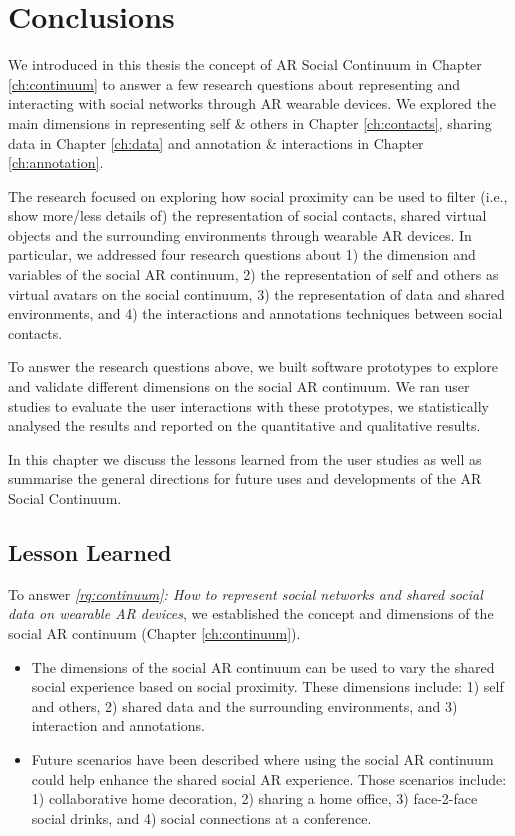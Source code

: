 \chapter{Conclusions}
\label{ch:conclusions}

We introduced in this thesis the concept of AR Social Continuum in Chapter \ref{ch:continuum} to answer a few research questions about representing and interacting with social networks through AR wearable devices. We explored the main dimensions in representing self \& others in Chapter \ref{ch:contacts}, sharing data in Chapter \ref{ch:data} and annotation \& interactions in Chapter \ref{ch:annotation}. 

The research focused on exploring how social proximity can be used to filter (i.e., show more/less details of) the representation of social contacts, shared virtual objects and the surrounding environments through wearable AR devices. In particular, we addressed four research questions about 1) the dimension and variables of the social AR continuum, 2) the representation of self and others as virtual avatars on the social continuum, 3) the representation of data and shared environments, and 4) the interactions and annotations techniques between social contacts.   

To answer the research questions above, we built software prototypes to explore and validate different dimensions on the social AR continuum. We ran user studies to evaluate the user interactions with these prototypes, we statistically analysed the results and reported on the quantitative and qualitative results. 

In this chapter we discuss the lessons learned from the user studies as well as summarise the general directions for future uses and developments of the AR Social Continuum. 

\pagebreak

\section{Lesson Learned}

To answer \textit{\ref{rq:continuum}: How to represent social networks and shared social data on wearable AR devices}, we established the concept and dimensions of the social AR continuum (Chapter \ref{ch:continuum}).

\begin{itemize}
    \item{The dimensions of the social AR continuum can be used to vary the shared social experience based on social proximity. These dimensions include: 1) self and others, 2) shared data and the surrounding environments, and 3) interaction and annotations.}
    \item{Future scenarios have been described where using the social AR continuum could help enhance the shared social AR experience. Those scenarios include: 1) collaborative home decoration, 2) sharing a home office, 3) face-2-face social drinks, and 4) social connections at a conference.}
\end{itemize}

